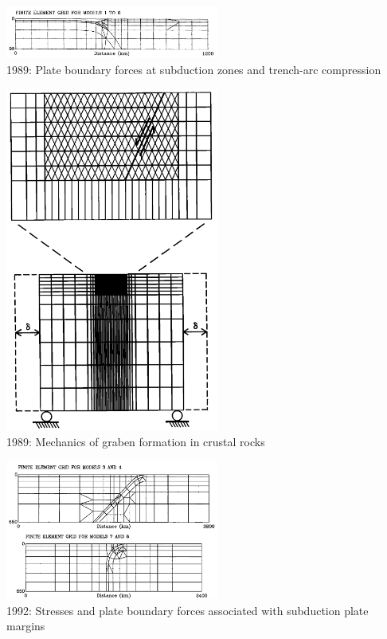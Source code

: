\begin{center}
\includegraphics[width=7cm]{images/history/boww89}\\
{\small 1989: Plate boundary forces at subduction zones and trench-arc compression \cite{boww89}}
\end{center}

\begin{center}
\includegraphics[width=7cm]{images/history/mewi89}\\
{\small 1989: Mechanics of graben formation in crustal rocks \cite{mewi89}}
\end{center}

\begin{center}
\includegraphics[width=7cm]{images/history/whbw92}\\
{\small 1992: Stresses and plate boundary forces associated with subduction plate margins
\cite{whbw92}}
\end{center}

